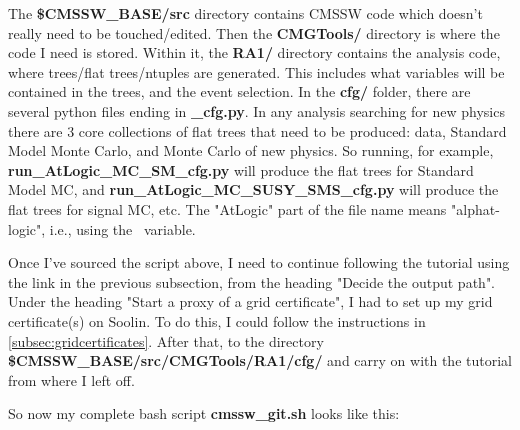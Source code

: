 The \textbf{\$CMSSW\_BASE/src} directory contains CMSSW code which doesn't really need to be touched/edited. Then the \textbf{CMGTools/} directory is where the code I need is stored. Within it, the \textbf{RA1/} directory contains the analysis code, where trees/flat trees/ntuples are generated. This includes what variables will be contained in the trees, and the event selection. In the \textbf{cfg/} folder, there are several python files ending in \textbf{\_cfg.py}. In any analysis searching for new physics there are 3 core collections of flat trees that need to be produced: data, Standard Model Monte Carlo, and Monte Carlo of new physics. So running, for example, \textbf{run\_AtLogic\_MC\_SM\_cfg.py} will produce the flat trees for Standard Model MC, and \textbf{run\_AtLogic\_MC\_SUSY\_SMS\_cfg.py} will produce the flat trees for signal MC, etc. The "AtLogic" part of the file name means "alphat-logic", i.e., using the \alphat\ variable.

Once I've sourced the script above, I need to continue following the tutorial using the link in the previous subsection, from the heading "Decide the output path". Under the heading "Start a proxy of a grid certificate", I had to set up my grid certificate(s) on Soolin. To do this, I could follow the instructions in \ref{subsec:gridcertificates}. After that, to the directory \textbf{\$CMSSW\_BASE/src/CMGTools/RA1/cfg/} and carry on with the tutorial from where I left off.


So now my complete bash script \textbf{cmssw\_git.sh} looks like this:



